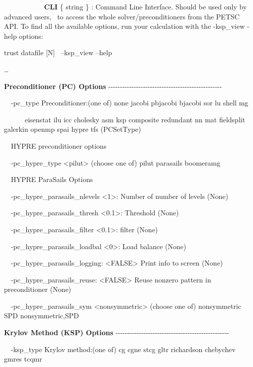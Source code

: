 \textbf{\ \ \ \ \ \ \ \ \ \ CLI }\{ string \} : Command Line Interface. Should be used only by advanced
users, \ to access the whole solver/preconditioners from the PETSC API. To find all the available options, run your
calculation with the -ksp\_view -help options:


\bigskip

trust datafile [N] \ {}--ksp\_view --help

{\dots}

\textbf{Preconditioner (PC) Options}
-{}-{}-{}-{}-{}-{}-{}-{}-{}-{}-{}-{}-{}-{}-{}-{}-{}-{}-{}-{}-{}-{}-{}-{}-{}-{}-{}-{}-{}-{}-{}-{}-{}-{}-{}-{}-{}-{}-{}-{}-{}-{}-{}-{}-{}-{}-{}-{}-

\ \ {}-pc\_type Preconditioner:(one of) none jacobi pbjacobi bjacobi sor lu shell mg

\ \ \ \ \ \ eisenstat ilu icc cholesky asm ksp composite redundant nn mat fieldsplit galerkin openmp spai hypre tfs
(PCSetType)

\ \ HYPRE preconditioner options

\ \ {}-pc\_hypre\_type {\textless}pilut{\textgreater} (choose one of) pilut parasails boomeramg

\ \ HYPRE ParaSails Options

\ \ {}-pc\_hypre\_parasails\_nlevels {\textless}1{\textgreater}: Number of number of levels (None)

\ \ {}-pc\_hypre\_parasails\_thresh {\textless}0.1{\textgreater}: Threshold (None)

\ \ {}-pc\_hypre\_parasails\_filter {\textless}0.1{\textgreater}: filter (None)

\ \ {}-pc\_hypre\_parasails\_loadbal {\textless}0{\textgreater}: Load balance (None)

\ \ {}-pc\_hypre\_parasails\_logging: {\textless}FALSE{\textgreater} Print info to screen (None)

\ \ {}-pc\_hypre\_parasails\_reuse: {\textless}FALSE{\textgreater} Reuse nonzero pattern in preconditioner (None)

\ \ {}-pc\_hypre\_parasails\_sym {\textless}nonsymmetric{\textgreater} (choose one of) nonsymmetric SPD nonsymmetric,SPD

\textbf{Krylov Method (KSP) Options}
-{}-{}-{}-{}-{}-{}-{}-{}-{}-{}-{}-{}-{}-{}-{}-{}-{}-{}-{}-{}-{}-{}-{}-{}-{}-{}-{}-{}-{}-{}-{}-{}-{}-{}-{}-{}-{}-{}-{}-{}-{}-{}-{}-{}-{}-{}-{}-{}-

\ \ {}-ksp\_type Krylov method:(one of) cg cgne stcg gltr richardson chebychev gmres tcqmr


